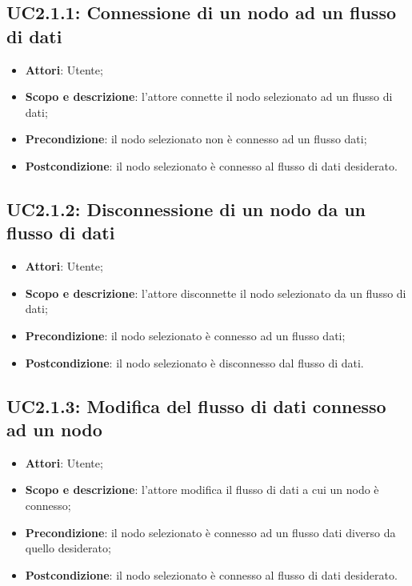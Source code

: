\subsection{UC2.1.1: Connessione di un nodo ad un flusso di dati}
\hypertarget{UC2.1.1}{}
\begin{itemize}
	\item \textbf{Attori}: Utente;
	\item \textbf{Scopo e descrizione}: l'attore connette il nodo selezionato ad un flusso di dati;
	\item \textbf{Precondizione}: il nodo selezionato non è connesso ad un flusso dati;
	\item \textbf{Postcondizione}: il nodo selezionato è connesso al flusso di dati desiderato.
\end{itemize}

\subsection{UC2.1.2: Disconnessione di un nodo da un flusso di dati}
\hypertarget{UC2.1.2}{}
\begin{itemize}
	\item \textbf{Attori}: Utente;
	\item \textbf{Scopo e descrizione}: l'attore disconnette il nodo selezionato da un flusso di dati;
	\item \textbf{Precondizione}: il nodo selezionato è connesso ad un flusso dati;
	\item \textbf{Postcondizione}: il nodo selezionato è disconnesso dal flusso di dati.
\end{itemize}

\subsection{UC2.1.3: Modifica del flusso di dati connesso ad un nodo}
\hypertarget{UC2.1.3}{}
\begin{itemize}
	\item \textbf{Attori}: Utente;
	\item \textbf{Scopo e descrizione}: l'attore modifica il flusso di dati a cui un nodo è connesso;
	\item \textbf{Precondizione}: il nodo selezionato è connesso ad un flusso dati diverso da quello desiderato;
	\item \textbf{Postcondizione}: il nodo selezionato è connesso al flusso di dati desiderato.
\end{itemize}
